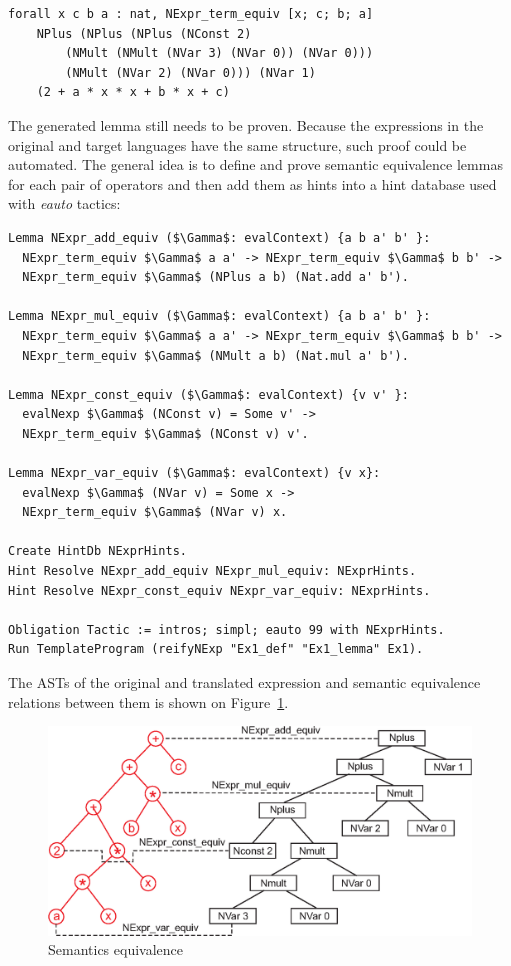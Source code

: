 \documentclass[sigplan]{acmart}\settopmatter{printfolios=true,printccs=false,printacmref=false}
\begin{document}
\begin{lstlisting}[language=Coq, mathescape=true,
  frame=single, basicstyle=\footnotesize]
forall x c b a : nat, NExpr_term_equiv [x; c; b; a]
    NPlus (NPlus (NPlus (NConst 2)
        (NMult (NMult (NVar 3) (NVar 0)) (NVar 0)))
        (NMult (NVar 2) (NVar 0))) (NVar 1)
    (2 + a * x * x + b * x + c)
\end{lstlisting}

The generated lemma still needs to be proven. Because the expressions
in the original and target languages have the same structure, such proof
could be automated. The general idea is to define and prove semantic
equivalence lemmas for each pair of operators and then add them as
hints into a hint database used with \emph{eauto} tactics:

\begin{lstlisting}[language=Coq, mathescape=true,
  frame=single, basicstyle=\footnotesize]
Lemma NExpr_add_equiv ($\Gamma$: evalContext) {a b a' b' }:
  NExpr_term_equiv $\Gamma$ a a' -> NExpr_term_equiv $\Gamma$ b b' ->
  NExpr_term_equiv $\Gamma$ (NPlus a b) (Nat.add a' b').

Lemma NExpr_mul_equiv ($\Gamma$: evalContext) {a b a' b' }:
  NExpr_term_equiv $\Gamma$ a a' -> NExpr_term_equiv $\Gamma$ b b' ->
  NExpr_term_equiv $\Gamma$ (NMult a b) (Nat.mul a' b').

Lemma NExpr_const_equiv ($\Gamma$: evalContext) {v v' }:
  evalNexp $\Gamma$ (NConst v) = Some v' ->
  NExpr_term_equiv $\Gamma$ (NConst v) v'.

Lemma NExpr_var_equiv ($\Gamma$: evalContext) {v x}:
  evalNexp $\Gamma$ (NVar v) = Some x ->
  NExpr_term_equiv $\Gamma$ (NVar v) x.

Create HintDb NExprHints.
Hint Resolve NExpr_add_equiv NExpr_mul_equiv: NExprHints.
Hint Resolve NExpr_const_equiv NExpr_var_equiv: NExprHints.

Obligation Tactic := intros; simpl; eauto 99 with NExprHints.
Run TemplateProgram (reifyNExp "Ex1_def" "Ex1_lemma" Ex1).
\end{lstlisting}

The ASTs of the original and translated expression and semantic
equivalence relations between them is shown on Figure~\ref{fig:trees}.

\begin{figure}[h]
  \includegraphics[width=\columnwidth]{trees.eps}
  \caption{Semantics equivalence}
  \label{fig:trees}
\end{figure}
\end{document}
